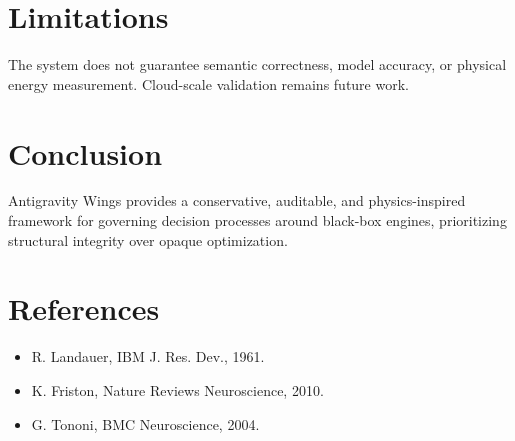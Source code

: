 \documentclass[11pt]{article}
\begin{document}
\section{Limitations}

The system does not guarantee semantic correctness, model accuracy, or physical energy measurement. Cloud-scale validation remains future work.

\section{Conclusion}

Antigravity Wings provides a conservative, auditable, and physics-inspired framework for governing decision processes around black-box engines, prioritizing structural integrity over opaque optimization.

\section*{References}

\begin{itemize}
\item R. Landauer, IBM J. Res. Dev., 1961.
\item K. Friston, Nature Reviews Neuroscience, 2010.
\item G. Tononi, BMC Neuroscience, 2004.
\end{itemize}
\end{document}
